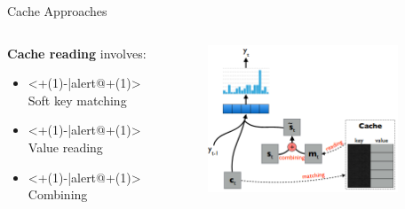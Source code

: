 \begin{frame}[c]{Cache Approaches}
	\begin{columns}[c] %
		\begin{column}{.50\textwidth}
			\textbf{Cache reading} involves:
			\begin{itemize}
				\item<+(1)-|alert@+(1)> Soft key matching
				\item<+(1)-|alert@+(1)> Value reading
				\item<+(1)-|alert@+(1)> Combining
			\end{itemize}
		\end{column}%
		\hfill%
		\begin{column}{.50\textwidth}
			\begin{figure}
				\centering
				\includegraphics[width=0.9\textwidth]{Images/cache_only}
				\label{fig:cacheonly}
			\end{figure}
		\end{column}%
	\end{columns} 
\end{frame}

